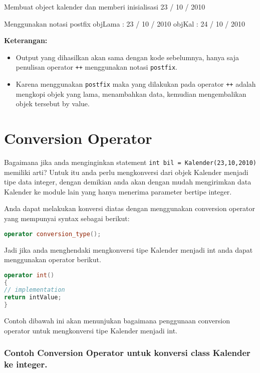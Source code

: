 \begin{lcverbatim}
Membuat object kalender dan memberi inisialisasi
23 / 10 / 2010

Menggunakan notasi postfix
objLama : 23 / 10 / 2010
objKal : 24 / 10 / 2010
\end{lcverbatim}

\textbf{Keterangan:}

\begin{itemize}

\item
  Output yang dihasilkan akan sama dengan kode sebelumnya, hanya saja
  penulisan operator \texttt{++} menggunakan notasi \texttt{postfix}.
\item
  Karena menggunakan \texttt{postfix} maka yang dilakukan pada operator
  \texttt{++} adalah mengkopi objek yang lama, menambahkan data,
  kemudian mengembalikan objek tersebut by value.
\end{itemize}

\section{Conversion Operator}\label{conversion-operator}

Bagaimana jika anda menginginkan statement
\texttt{int\ bil\ =\ Kalender(23,10,2010)} memiliki arti? Untuk itu anda
perlu mengkonversi dari objek Kalender menjadi tipe data integer, dengan
demikian anda akan dengan mudah mengirimkan data Kalender ke module lain
yang hanya menerima parameter bertipe integer.

Anda dapat melakukan konversi diatas dengan menggunakan conversion
operator yang mempunyai syntax sebagai berikut:

\begin{lstlisting}[language=c++, numbers=none]
operator conversion_type();
\end{lstlisting}

Jadi jika anda menghendaki mengkonversi tipe Kalender menjadi int anda
dapat menggunakan operator berikut.

\begin{lstlisting}[language=c++, numbers=none]
operator int()
{
// implementation
return intValue;
}
\end{lstlisting}

Contoh dibawah ini akan menunjukan bagaimana penggunaan conversion
operator untuk mengkonversi tipe Kalender menjadi int.

\subsubsection*{Contoh Conversion Operator untuk konversi class Kalender ke integer.}


